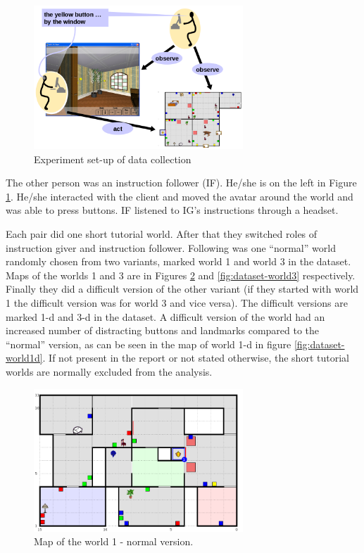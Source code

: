 \begin{figure}[!htbp]
  \centering
	\includegraphics[width=0.7\textwidth]{Images/experiment-set-up}
	\caption{Experiment set-up of data collection}
	\label{fig:give-experiment-setup}
\end{figure}

The other person was an instruction follower (IF). He/she is on the left in Figure \ref{fig:give-experiment-setup}. He/she interacted with the client and moved the avatar around the world and was able to press buttons. IF listened to IG's instructions through a headset.

Each pair did one short tutorial world. After that they switched roles of instruction giver and instruction follower. Following was one ``normal'' world randomly chosen from two variants, marked world 1 and world 3 in the dataset. Maps of the worlds 1 and 3 are in Figures \ref{fig:dataset-world1} and \ref{fig:dataset-world3} respectively. Finally they did a difficult version of the other variant (if they started with world 1 the difficult version was for world 3 and vice versa). The difficult versions are marked 1-d and 3-d in the dataset. A difficult version of the world had an increased number of distracting buttons and landmarks compared to the ``normal'' version, as can be seen in the map of world 1-d in figure \ref{fig:dataset-world1d}. If not present in the report or not stated otherwise, the short tutorial worlds are normally excluded from the analysis.

\begin{figure}[!htbp]
  \centering
	\includegraphics[width=0.7\textwidth]{Images/dataset-world1}
	\caption{Map of the world 1 - normal version.}
	\label{fig:dataset-world1}
\end{figure}

